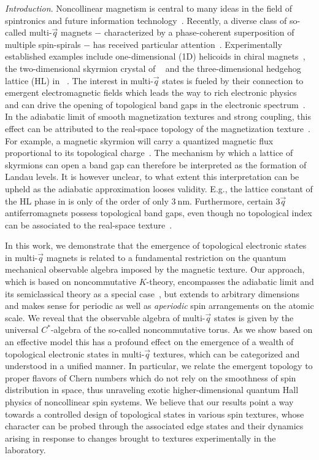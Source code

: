 \documentclass[
    10pt,
    aps,
    prr,
    twocolumn,
    floatfix,
    superscriptaddress
]{revtex4-2}
\newcommand{\revise}[1]{{\color{red} #1}}
\begin{document}
\revise{{\it Introduction}}. Noncollinear magnetism is central to many ideas in the field of spintronics and future information technology~\cite{Vedmedenko2020, Back2020}.
Recently, a diverse class of so-called multi-$\vec{q}$ magnets $-$ characterized by a phase-coherent superposition of multiple spin-spirals $-$ has received particular attention~\cite{Okubo2012, Takagi2018, Hirschberger2019, Fujishiro2019, Okumura2020}.
Experimentally established examples include one-dimensional (1D) helicoids in chiral magnets~\cite{Adams2012,Janoschek2013}, the two-dimensional skyrmion crystal of ~\cite{Neubauer2009} and the three-dimensional hedgehog lattice (HL) in ~\cite{Tanigaki2015}.
The interest in multi-$\vec{q}$ states is fueled by their connection to emergent electromagnetic fields which leads the way to rich electronic physics~\cite{ Bliokh2005, Fujita2011}
and can drive the opening of topological band gaps in the electronic spectrum~\cite{Hamamoto2015, Goebel2017, Goebel2018}.
In the adiabatic limit of smooth magnetization textures and strong coupling, this effect can be attributed to the real-space topology of the magnetization texture~\cite{Bruno2004, EverschorSitte2014}.
For example, a magnetic skyrmion will carry a quantized magnetic flux proportional to its topological charge~\cite{Nagaosa2013}. 
The mechanism by which a lattice of skyrmions can open a band gap can therefore be interpreted as the formation of Landau levels.
It is however unclear, to what extent this interpretation can be upheld as the adiabatic approximation looses validity.
E.g., the lattice constant of the HL phase in  is only of the order of only $\SI{3}{\nano\meter}$.
Furthermore, certain $3\vec{q}$ antiferromagnets possess topological band gaps, even though no topological index can be associated to the real-space texture~\cite{Ndiaye2019, Feng2020}.

In this work, we demonstrate that the emergence of topological electronic states in multi-$\vec{q}$ magnets is related to a fundamental restriction on the quantum mechanical observable algebra imposed by the magnetic texture. 
Our approach, which is based on noncommutative $K$-theory, encompasses the adiabatic limit and its semiclassical theory as a special case~\cite{Su2020}, but extends 
to arbitrary dimensions and makes sense for periodic as well as {\it aperiodic} spin arrangements on the atomic scale.
We reveal that the observable algebra of multi-$\vec{q}$ states is given by the universal $C^\ast$-algebra of the so-called noncommutative torus. 
As we show based on an effective model this has a profound effect on the emergence of a wealth of topological electronic states in multi-$\vec{q}$ textures, which can be categorized and understood in a unified manner. 
In particular, we relate the emergent topology to proper flavors of Chern numbers which do not rely on the smoothness of spin distribution in space, thus unraveling exotic higher-dimensional quantum Hall physics of noncollinear spin systems.
We believe that our results point a way towards a controlled design of topological states in various spin textures, whose character can be probed through the associated edge states and their dynamics arising in response to changes brought to textures experimentally in the laboratory. 
\end{document}
